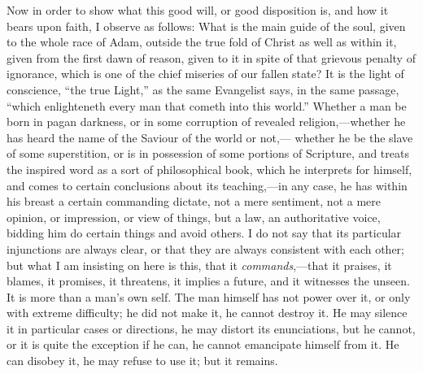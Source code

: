 Now in order to show what this good will, or good
disposition is, and how it bears upon faith, I observe as
follows: What is the main guide of the soul, given to the
whole race of Adam, outside the true fold of Christ as
well as within it, given from the first dawn of reason,
given to it in spite of that grievous penalty of
ignorance, which is one of the chief miseries of our
fallen state? It is the light of conscience, ``the
true Light,'' as the same Evangelist says, in the
same passage, ``which enlighteneth every man that
cometh into this world.'' Whether a man be born in
pagan darkness, or in some corruption of revealed
religion,—whether he has heard the name of the
Saviour of the world or not,— whether he be the slave of
some superstition, or is in possession of some portions
of Scripture, and treats the inspired word as a sort of
philosophical book, which he interprets for himself, and
comes to certain conclusions about its teaching,—in
any case, he has within his breast a certain commanding
dictate, not a mere sentiment, not a mere opinion, or
impression, or view of things, but a law, an
authoritative voice, bidding him do certain things and
avoid others. I do not say that its particular
injunctions are always clear, or that they are always
consistent with each other; but what I am insisting on
here is this, that it \emph{commands},—that it
praises, it blames, it promises, it threatens, it implies
a future, and it witnesses the unseen. It is more than a
man's own self. The man himself has not power over it, or
only with extreme difficulty; he did not make it, he
cannot destroy it. He may silence it in particular cases
or directions, he may distort its enunciations, but he
cannot, or it is quite the exception if he can, he cannot
emancipate himself from it. He can disobey it, he may
refuse to use it; but it remains.

